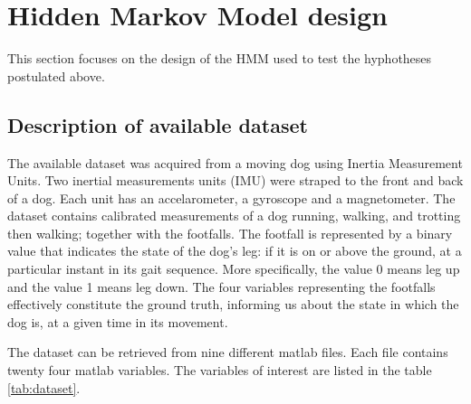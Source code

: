 \chapter{Hidden Markov Model design}






This section focuses on the design of the HMM used to test the hyphotheses postulated above.

\section{Description of available dataset}

The available dataset was acquired from a moving dog using Inertia Measurement Units. 
Two inertial measurements units (IMU) were straped to the front and back of a dog. Each unit has an accelarometer, a gyroscope and a magnetometer. The dataset contains calibrated measurements of a dog running, walking, and trotting then walking; together with the footfalls. The footfall is represented by a binary value that indicates the state of the dog's leg: if it is on or above the ground, at a particular instant in its gait sequence. More specifically, the value 0 means leg up and the value 1 means leg down.
The four variables representing the footfalls effectively constitute the ground truth, informing us about the state in which the dog is, at a given time in its movement.

The dataset can be retrieved from nine different matlab files. Each file contains twenty four matlab variables. The variables of interest are listed in the table \ref{tab:dataset}. 

